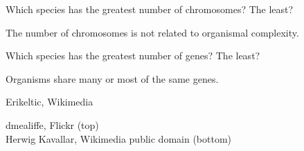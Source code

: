 \documentclass[t,handout]{beamer}  %
\begin{document}
{
\begin{frame}[b]{Which species has the greatest number of chromosomes? The least?}

\end{frame}
}
%
%
{
\begin{frame}[b]{The number of chromosomes is not related to organismal complexity.}

\end{frame}
}
%
%
{
\begin{frame}[b]{Which species has the greatest number of genes? The least?}

\end{frame}
}
%
%
{
\begin{frame}[b]{Organisms share many or most of the same genes.}

\end{frame}
}
%
%
{
\begin{frame}[b]

\tiny Erikeltic, Wikimedia 
\end{frame}
}
%
{
\begin{frame}[b]
	
\tiny  dmealiffe, Flickr  (top)\\Herwig Kavallar, Wikimedia public domain (bottom)
\end{frame}
}
%
\end{document}
